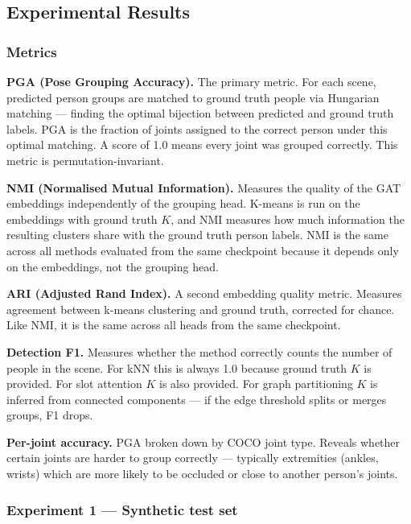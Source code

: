\subsection{Experimental Results}

\subsubsection{Metrics}

\textbf{PGA (Pose Grouping Accuracy).} The primary metric. For each scene, predicted person groups are matched to ground truth people via Hungarian matching --- finding the optimal bijection between predicted and ground truth labels. PGA is the fraction of joints assigned to the correct person under this optimal matching. A score of 1.0 means every joint was grouped correctly. This metric is permutation-invariant.

\textbf{NMI (Normalised Mutual Information).} Measures the quality of the GAT embeddings independently of the grouping head. K-means is run on the embeddings with ground truth $K$, and NMI measures how much information the resulting clusters share with the ground truth person labels. NMI is the same across all methods evaluated from the same checkpoint because it depends only on the embeddings, not the grouping head.

\textbf{ARI (Adjusted Rand Index).} A second embedding quality metric. Measures agreement between k-means clustering and ground truth, corrected for chance. Like NMI, it is the same across all heads from the same checkpoint.

\textbf{Detection F1.} Measures whether the method correctly counts the number of people in the scene. For kNN this is always 1.0 because ground truth $K$ is provided. For slot attention $K$ is also provided. For graph partitioning $K$ is inferred from connected components --- if the edge threshold splits or merges groups, F1 drops.

\textbf{Per-joint accuracy.} PGA broken down by COCO joint type. Reveals whether certain joints are harder to group correctly --- typically extremities (ankles, wrists) which are more likely to be occluded or close to another person's joints.


\subsubsection{Experiment 1 --- Synthetic test set}

